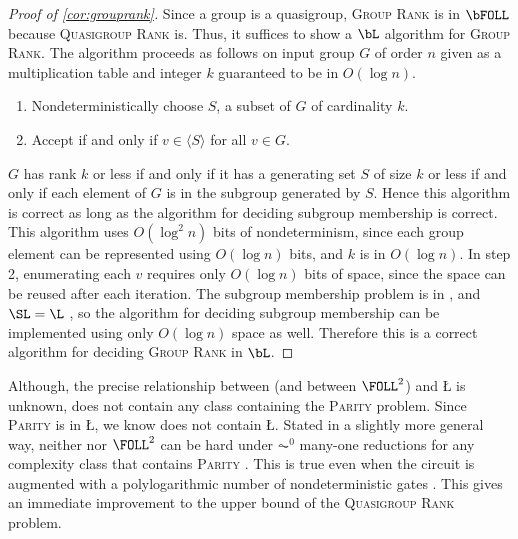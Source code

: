 \documentclass{article}
\begin{document}

\begin{proof}[Proof of \autoref{cor:grouprank}]
  Since a group is a quasigroup, \textsc{Group Rank} is in $\bFOLL$ because \textsc{Quasigroup Rank} is.
  Thus, it suffices to show a $\bL$ algorithm for \textsc{Group Rank}.
  The algorithm proceeds as follows on input group $G$ of order $n$ given as a multiplication table and integer $k$ guaranteed to be in $O(\log n)$.
  \begin{enumerate}
  \item Nondeterministically choose $S$, a subset of $G$ of cardinality $k$.
  \item Accept if and only if $v \in \langle S \rangle$ for all $v \in G$.
  \end{enumerate}
  $G$ has rank $k$ or less if and only if it has a generating set $S$ of size $k$ or less if and only if each element of $G$ is in the subgroup generated by $S$.
  Hence this algorithm is correct as long as the algorithm for deciding subgroup membership is correct.
  This algorithm uses $O(\log^2 n)$ bits of nondeterminism, since each group element can be represented using $O(\log n)$ bits, and $k$ is in $O(\log n)$.
  In step 2, enumerating each $v$ requires only $O(\log n)$ bits of space, since the space can be reused after each iteration.
  The subgroup membership problem is in \SL{} \cite[Section~3]{bm89}, and $\SL = \L$ \cite{reingold08}, so the algorithm for deciding subgroup membership can be implemented using only $O(\log n)$ space as well.
  Therefore this is a correct algorithm for deciding \textsc{Group Rank} in $\bL$.
\end{proof}

Although, the precise relationship between \FOLL{} (and between $\FOLL^2$) and \L{} is unknown, \FOLL{} does not contain any class containing the \textsc{Parity} problem.
Since \textsc{Parity} is in \L, we know \FOLL{} does not contain \L.
Stated in a slightly more general way, neither \FOLL{} nor $\FOLL^2$ can be hard under $\AC^0$ many-one reductions for any complexity class that contains \textsc{Parity} \cite[Proposition~2.1]{bklm01}.
This is true even when the circuit is augmented with a polylogarithmic number of nondeterministic gates \cite[Section~4]{ctw13}.
This gives an immediate improvement to the upper bound of the \textsc{Quasigroup Rank} problem.
\end{document}
